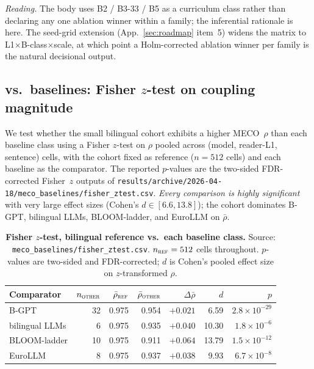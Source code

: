 \emph{Reading.} The body uses B2 / B3-33 / B5 as a curriculum class rather than declaring any one ablation winner within a family; the inferential rationale is here. The seed-grid extension (App.~\ref{sec:roadmap} item~5) widens the matrix to L1$\times$B-class$\times$scale, at which point a Holm-corrected ablation winner per family is the natural decisional output.

\subsection{\beetle{} vs.\ baselines: Fisher $z$-test on coupling magnitude}\label{sec:sig-fisher}

We test whether the small \beetle{} bilingual cohort exhibits a higher MECO~$\rho$ than each baseline class using a Fisher $z$-test on $\rho$ pooled across (model, reader-L1, sentence) cells, with the \beetle{} cohort fixed as reference ($n=512$ cells) and each baseline as the comparator. The reported $p$-values are the two-sided FDR-corrected Fisher~$z$ outputs of \texttt{results/archive/2026-04-18/meco\_baselines/fisher\_ztest.csv}. \emph{Every comparison is highly significant} with very large effect sizes (Cohen's $d \in [6.6, 13.8]$); the \beetle{} cohort dominates B-GPT, bilingual LLMs, BLOOM-ladder, and EuroLLM on $\bar\rho$.

\begin{table}[!ht]
  \centering
  \small
  \caption{\textbf{Fisher $z$-test, \beetle{} bilingual reference vs.\ each baseline class.} Source: \texttt{meco\_baselines/fisher\_ztest.csv}. $n_\textsc{ref}=512$ cells throughout. $p$-values are two-sided and FDR-corrected; $d$ is Cohen's pooled effect size on $z$-transformed $\rho$.}
  \label{tab:sig_fisher}
  \begin{tabular}{lrrrrrr}
    \toprule
    Comparator & $n_\textsc{other}$ & $\bar\rho_\textsc{ref}$ & $\bar\rho_\textsc{other}$ & $\Delta\bar\rho$ & $d$ & $p$ \\
    \midrule
    B-GPT           & 32 & 0.975 & 0.954 & $+0.021$ & 6.59 & $2.8{\times}10^{-29}$ \\
    bilingual LLMs  &  6 & 0.975 & 0.935 & $+0.040$ & 10.30 & $1.8{\times}10^{-6}$ \\
    BLOOM-ladder    & 10 & 0.975 & 0.911 & $+0.064$ & 13.79 & $1.5{\times}10^{-12}$ \\
    EuroLLM         &  8 & 0.975 & 0.937 & $+0.038$ & 9.93 & $6.7{\times}10^{-8}$ \\
    \bottomrule
  \end{tabular}
\end{table}

